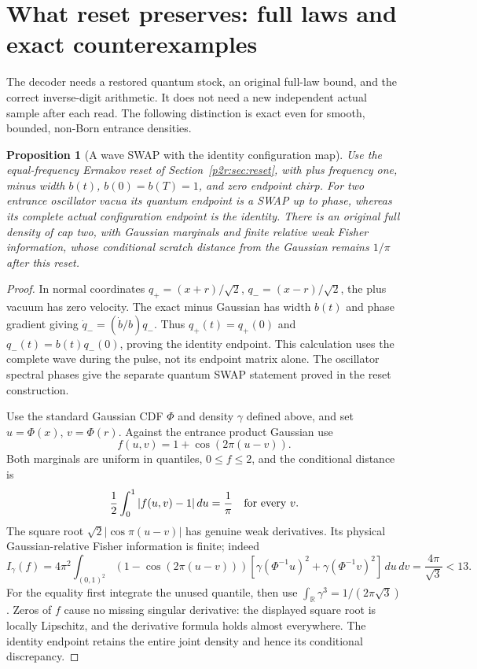\documentclass[11pt]{article}
\numberwithin{equation}{section}
\newtheorem{proposition}[theorem]{Proposition}
\theoremstyle{definition}
\theoremstyle{remark}
\begin{document}
\section{What reset preserves: full laws and exact counterexamples}\label{p2s:sec:scope}

The decoder needs a restored quantum stock, an original full-law bound, and
the correct inverse-digit arithmetic. It does not need a new independent
actual sample after each read. The following distinction is exact even for
smooth, bounded, non-Born entrance densities.

\begin{proposition}[A wave SWAP with the identity configuration map]
\label{p2s:prop:swap}
Use the equal-frequency Ermakov reset of Section~\ref{p2r:sec:reset}, with
plus frequency one, minus width $b(t)$, $b(0)=b(T)=1$, and zero endpoint chirp.
For two entrance oscillator vacua its quantum endpoint is a SWAP up to phase,
whereas its complete actual configuration endpoint is the identity.
There is an original full density of cap two, with Gaussian marginals and
finite relative weak Fisher information, whose conditional scratch distance
from the Gaussian remains $1/\pi$ after this reset.
\end{proposition}
\begin{proof}
In normal coordinates $q_+=(x+r)/\sqrt2$, $q_-=(x-r)/\sqrt2$, the plus
vacuum has zero velocity. The exact minus Gaussian has width $b(t)$ and
phase gradient giving $\dot q_-=(\dot b/b)q_-$. Thus
$q_+(t)=q_+(0)$ and $q_-(t)=b(t)q_-(0)$, proving the identity endpoint.
This calculation uses the complete wave during the pulse, not its endpoint
matrix alone. The oscillator spectral phases give the separate quantum
SWAP statement proved in the reset construction.

Use the standard Gaussian CDF $\Phi$ and density $\gamma$ defined above,
and set $u=\Phi(x)$, $v=\Phi(r)$. Against the entrance product Gaussian use
\begin{equation}\label{p2s:eq:correlated}
 f(u,v)=1+\cos(2\pi(u-v)).
\end{equation}
Both marginals are uniform in quantiles, $0\leq f\leq2$, and the conditional
distance is
\[
 \frac12\int_0^1|f(u,v)-1|\,du=\frac1\pi
 \quad\hbox{for every }v.
\]
The square root $\sqrt2|\cos\pi(u-v)|$ has genuine weak derivatives.
Its physical Gaussian-relative Fisher information is finite; indeed
\[
 I_\gamma(f)=4\pi^2\!\int_{(0,1)^2}
 (1-\cos(2\pi(u-v)))
 [\gamma(\Phi^{-1}u)^2+\gamma(\Phi^{-1}v)^2]\,du\,dv
 =\frac{4\pi}{\sqrt3}<13.
\]
For the equality first integrate the unused quantile, then use
$\int_{\mathbb R}\gamma^3=1/(2\pi\sqrt3)$. Zeros of $f$ cause no missing
singular derivative: the displayed square root is locally Lipschitz, and
the derivative formula holds almost everywhere. The identity endpoint
retains the entire joint density and hence its conditional discrepancy.
\end{proof}
\end{document}
